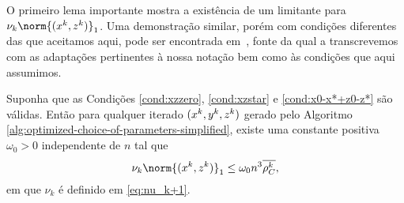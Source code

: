 
O primeiro lema importante mostra a existência de um limitante para $\nu_k\norm{(\xk,\zk)}_{1}$. Uma demonstração similar, porém com condições diferentes das que aceitamos aqui, pode ser encontrada em~\cite[Lema 6.1]{Wright:Primal-dual-interior-point:1997h}, fonte da qual a transcrevemos com as adaptações pertinentes à nossa notação bem como às condições que aqui assumimos.




\begin{lema}\label{lemma:boundxz1}
	Suponha que as Condições \ref{cond:xzzero}, \ref{cond:xzstar} e \ref{cond:x0-x*+z0-z*} são válidas. Então para qualquer iterado $(x^{k},y^{k},z^{k})$ gerado pelo Algoritmo \ref{alg:optimized-choice-of-parameters-simplified}, existe uma constante positiva $\omega_{0}>0$ independente de $n$ tal que 
	\begin{equation}
		\label{eq:bound-xkzk}
		\nu_k\norm{(\xk,\zk)}_{1} \leq  \omega_{0} n^{3} \dbvec{\rho_C^{k}},
	\end{equation}
	em que $\nu_k$ é definido em \eqref{eq:nu_k+1}.
\end{lema}

